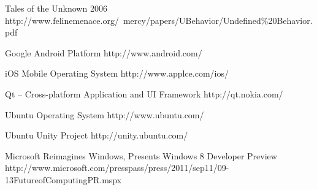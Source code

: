 \begin{thebibliography}{9}
		{Tales of the Unknown}
		{2006}
		{http://www.felinemenace.org/~mercy/papers/UBehavior/Undefined\%20Behavior.pdf}
	

		{Google Android Platform}
		{http://www.android.com/}
	
		{iOS Mobile Operating System}
		{http://www.applce.com/ios/}
		
		{Qt -- Cross-platform Application and UI Framework}
		{http://qt.nokia.com/}
	
		{Ubuntu Operating System}
		{http://www.ubuntu.com/}
		
		{Ubuntu Unity Project}
		{http://unity.ubuntu.com/}
	
		{Microsoft Reimagines Windows, Presents Windows 8 Developer Preview}
		{http://www.microsoft.com/presspass/press/2011/sep11/09-13FutureofComputingPR.mspx}

\end{thebibliography}